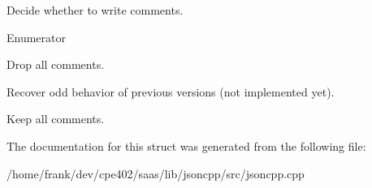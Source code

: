 Decide whether to write comments. 

\begin{Desc}
\item[Enumerator]\par
\begin{description}
\item[{\em 
\hypertarget{struct_json_1_1_comment_style_a51fc08f3518fd81eba12f340d19a3d0cac8b32a8bae63414c8647d4919da8d437}{}None\label{struct_json_1_1_comment_style_a51fc08f3518fd81eba12f340d19a3d0cac8b32a8bae63414c8647d4919da8d437}
}]Drop all comments. \item[{\em 
\hypertarget{struct_json_1_1_comment_style_a51fc08f3518fd81eba12f340d19a3d0cac65238f050773c107690a456e9c05c98}{}Most\label{struct_json_1_1_comment_style_a51fc08f3518fd81eba12f340d19a3d0cac65238f050773c107690a456e9c05c98}
}]Recover odd behavior of previous versions (not implemented yet). \item[{\em 
\hypertarget{struct_json_1_1_comment_style_a51fc08f3518fd81eba12f340d19a3d0ca32302c0b97190c1808b3e38f367fef01}{}All\label{struct_json_1_1_comment_style_a51fc08f3518fd81eba12f340d19a3d0ca32302c0b97190c1808b3e38f367fef01}
}]Keep all comments. \end{description}
\end{Desc}


The documentation for this struct was generated from the following file\+:\begin{DoxyCompactItemize}
\item 
/home/frank/dev/cpe402/saas/lib/jsoncpp/src/jsoncpp.\+cpp\end{DoxyCompactItemize}
